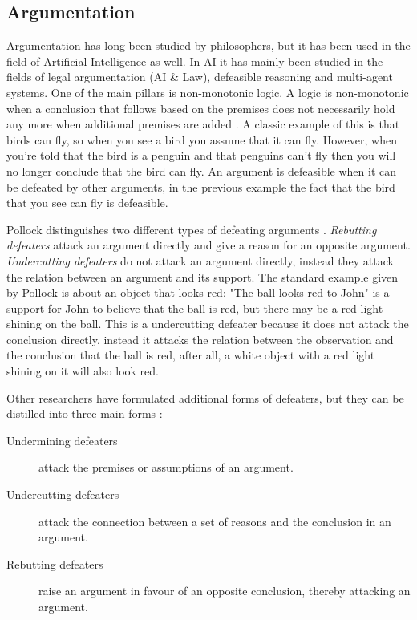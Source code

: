 \documentclass[a4paper]{article}
\begin{document}
\subsection{Argumentation}
Argumentation has long been studied by philosophers, but it has been used in
the field of Artificial Intelligence as well. In AI it has mainly been studied
in the fields of
legal argumentation (AI \& Law), defeasible reasoning and multi-agent systems.
One of the main pillars is non-monotonic logic. A logic is non-monotonic when a
conclusion that follows based on the premises does not necessarily hold any
more when additional premises are added \cite{vaneemeren2014}. A classic
example of this is that birds can fly, so when you see a bird you assume that
it can fly. However, when you're told that the bird is a penguin and that
penguins can't fly then you will no longer conclude that the bird can fly. An
argument is defeasible when it can be defeated by other arguments, in the
previous example the fact that the bird that you see can fly is defeasible.

Pollock distinguishes two different types of defeating arguments
\cite{pollock1995}. \emph{Rebutting defeaters} attack an argument directly and
give a reason for an opposite argument. \emph{Undercutting defeaters} do not
attack an argument directly, instead they attack the relation between an
argument and its support. The standard example given by Pollock is about an
object that looks red: "The ball looks red to John" is a support for John to
believe that the ball is red, but there may be a red light shining on the ball.
This is a undercutting defeater because it does not attack the conclusion
directly, instead it attacks the relation between the observation and the
conclusion that the ball is red, after all, a white object with a red light
shining on it will also look red.

Other researchers have formulated additional forms of defeaters, but they can
be distilled into three main forms \cite{vaneemeren2014}:
\begin{description}
	\item[Undermining defeaters] attack the premises or assumptions of an
	argument.
	\item[Undercutting defeaters] attack the connection between a set of
	reasons and the conclusion in an argument.
	\item[Rebutting defeaters] raise an argument in favour of an opposite
	conclusion, thereby attacking an argument.
\end{description}
\end{document}
